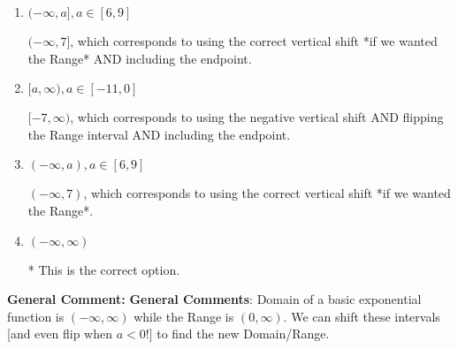 \documentclass{extbook}[14pt]
\begin{document}
\begin{enumerate}
{\begin{enumerate}[label=\Alph*.]
$(-7, \infty)$, which corresponds to using the negative vertical shift AND flipping the Range interval.
\item \( (-\infty, a], a \in [6, 9] \)

$(-\infty, 7]$, which corresponds to using the correct vertical shift *if we wanted the Range* AND including the endpoint.
\item \( [a, \infty), a \in [-11, 0] \)

$[-7, \infty)$, which corresponds to using the negative vertical shift AND flipping the Range interval AND including the endpoint.
\item \( (-\infty, a), a \in [6, 9] \)

$(-\infty, 7)$, which corresponds to using the correct vertical shift *if we wanted the Range*.
\item \( (-\infty, \infty) \)

* This is the correct option.
\end{enumerate}

\textbf{General Comment:} \textbf{General Comments}: Domain of a basic exponential function is $(-\infty, \infty)$ while the Range is $(0, \infty)$. We can shift these intervals [and even flip when $a<0$!] to find the new Domain/Range.
}
\end{enumerate}
\end{document}
